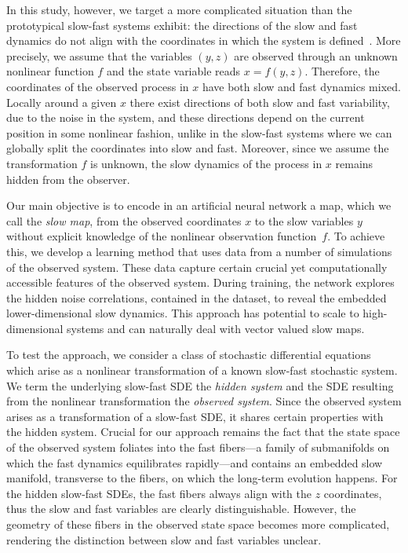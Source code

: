 \documentclass{article}
\begin{document}
In this study, however, we target a more complicated situation than the prototypical slow-fast systems exhibit: the directions of the slow and fast dynamics do not align with the coordinates in which the system is defined~\cite{singer_detecting_2009, dsilva_data-driven_2016, froyland_trajectory-free_2016}. More precisely, we assume that the variables $(y,z)$ are observed through an unknown nonlinear function $f$ and the state variable reads $x=f(y,z)$. Therefore, the coordinates of the observed process in $x$ have both slow and fast dynamics mixed. Locally around a given $x$ there exist directions of both slow and fast variability, due to the noise in the system, and these directions depend on the current position in some nonlinear fashion, unlike in the slow-fast systems where we can globally split the coordinates into slow and fast. Moreover, since we assume the transformation $f$ is unknown, the slow dynamics of the process in $x$ remains hidden from the observer.

Our main objective is to encode in an artificial neural network a map, which we call the \emph{slow map}, from the observed coordinates $x$ to the slow variables $y$ without explicit knowledge of the nonlinear observation function~$f$. To achieve this, we develop a learning method that uses data from a number of simulations of the observed system. These data capture certain crucial yet computationally accessible features of the observed system. During training, the network explores the hidden noise correlations, contained in the dataset, to reveal the embedded lower-dimensional slow dynamics. This approach has potential to scale to high-dimensional systems and can naturally deal with vector valued slow maps.

To test the approach, we consider a class of stochastic differential equations which arise as a nonlinear transformation of a known slow-fast stochastic system. We term the underlying slow-fast SDE the \emph{hidden system} and the SDE resulting from the nonlinear transformation the \emph{observed system}. Since the observed system arises as a transformation of a slow-fast SDE, it shares certain properties with the hidden system. Crucial for our approach remains the fact that the state space of the observed system foliates into the fast fibers---a family of submanifolds on which the fast dynamics equilibrates rapidly---and contains an embedded slow manifold, transverse to the fibers, on which the long-term evolution happens. For the hidden slow-fast SDEs, the fast fibers always align with the $z$ coordinates, thus the slow and fast variables are clearly distinguishable. However, the geometry of these fibers in the observed state space becomes more complicated, rendering the distinction between slow and fast variables unclear.
\end{document}
